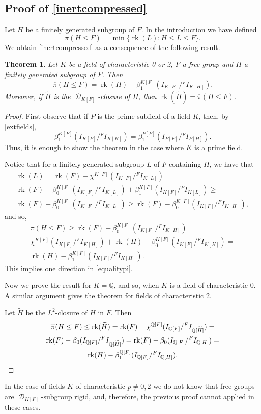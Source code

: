 \documentclass{amsart}
\newtheorem{teo}[lem]{Theorem}
\theoremstyle{definition}
\theoremstyle{remark}
\DeclareMathOperator{\D}{\mathcal D}
\DeclareMathOperator{\rk}{rk}
\newcommand{\bpi}{\overline{\pi}}
\newcommand{\Q}{\mathbb{Q}}
\begin{document}
\subsection{Proof of   \cref{inertcompressed}} Let  $H$ be a finitely generated subgroup of $F$. In the introduction we have defined
$$
\bpi(H\leq F)=\min\{\rk(L)\colon H\le L\le F\} .$$
We obtain 
\cref{inertcompressed} as a consequence of the following result.
\begin{teo}\label{pibar}
Let $K$ be a field of characteristic 0 or 2, $F$  a free group and $H$ a finitely generated subgroup of $F$. Then 
\begin{equation}
\label{equalitypi}
\bpi(H\leq F) =\rk(H)-\beta_1^{K[F]}(I_{K[F]}/{}^FI_{K[H]}).
\end{equation}
Moreover, if $\widetilde H$ is the $\D_{K[F]}$-closure of $H$, then $\rk(\widetilde H)=\bpi(H\leq F) $.

\end{teo}
\begin{proof}
First observe that if $P$ is the prime subfield of  a field $K$, then, by  \cref{extfields},   
$$\beta_1^{K[F]}(I_{K[F]}/{}^F I_{K[H]})=\beta_1^{P[F]}(I_{P[F]}/{}^FI_{P[H]}).$$ Thus, it is enough to show the theorem in the case where $K$ is a  prime field.

Notice that   for a finitely generated subgroup $L$ of $F$ containing $H$, we have that
\begin{multline*}
\rk(L)=\rk(F)-\chi^{K[F]}(I_{K[F]}/{}^FI_{K[L]})=\\
\rk (F)-\beta_0^{K[F]}(I_{K[F]}/{}^FI_{K[L]})+
\beta_1^{K[F]}(I_{K[F]}/{}^FI_{K[L]})\geqslant \\ \rk (F)-\beta_0^{K[F]}(I_{K[F]}/{}^FI_{K[L]})\geqslant  \rk (F)-\beta_0^{K[F]}(I_{K[F]}/{}^FI_{K[H]}),\end{multline*}
and so, 
\begin{multline}\label{onedirection}
\bpi(H\leq F)\geqslant \rk (F)-\beta_0^{K[F]}(I_{K[F]}/{}^FI_{K[H]})= \\ 
\chi^{K[F]} (I_{K[F]}/{}^FI_{K[H]})+\rk(H)-\beta_0^{K[F]}(I_{K[F]}/{}^FI_{K[H]})=\\
\rk(H)-\beta_1^{K[F]}(I_{K[F]}/{}^FI_{K[H]}).
\end{multline}
This implies  one direction in \cref{equalitypi}.

Now we prove  the result  for $K=\Q$, and so, when $K$ is a field of characteristic 0. A similar argument gives the theorem for fields of characteristic 2.

Let $\widetilde H$ be the $L^2$-closure of $H$ in $F$. Then
\begin{multline}\label{inclosed}
\bpi(H\leq F)\leq \rk(\widetilde H)=\rk(F)-\chi^{\Q[F]}(I_{\Q[F]}/{}^FI_{\Q[\widetilde H]})=\\ \rk(F)-\beta_0(I_{\Q[F]}/{}^FI_{\Q[\widetilde H]})= \rk(F)-\beta_0(I_{\Q[F]}/{}^FI_{\Q[ H]})=\\ \rk(H)-\beta_1^{\Q[F]}(I_{\Q[F]}/{}^FI_{\Q[H]}).\qedhere
\end{multline}
 \end{proof}
 In the case of fields $K$ of characteristic $p\ne 0,2$ we do not know that free groups are $\D_{K[F]}$-subgroup rigid, and, therefore, the previous proof cannot applied in these cases.
\end{document}

